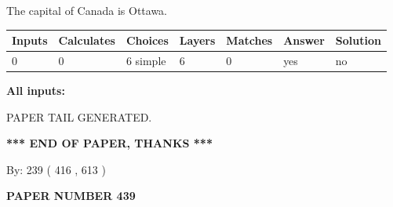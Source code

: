 \documentclass[12pt]{article}
\begin{document}
 
The capital of Canada is Ottawa.
 
 
\noindent{}
 
 
   
   
   
   
\noindent\begin{tabular}{|l|l|l|l|l|l|l|}
 \hline
Inputs & Calculates & Choices & Layers & Matches & Answer & Solution \\ \hline
 0  & 
 0  & 
 6
  simple  
  & 
 6  & 
 0  & 
  yes & 
  no 
  \\ \hline
 \end{tabular}
   
   
   
   
\noindent{}
   
   
   
   
\noindent\vspace{0.1in}\hspace{-0.08in} {\textbf{\Large{All inputs: }}}
   
   
   
   
   
   
 \vspace{0.2in}
 
   
   
\vspace{2.0in} PAPER TAIL GENERATED.
   
   
   
   
\vspace{1.0in} 
{\textbf{\large{ *** END OF PAPER, THANKS *** }}} 
   
   
\hspace{1.0in} By: 
 239 ( 416 ,  613 )
   
   
   
   
\newpage 
\setcounter{page}{ 
   439001 } 
   
   
   
   
 {\textbf{ \Large{ PAPER NUMBER  439  }}}
   
   
\vspace{0.2in}
   
   
   
   
   
   
   
\end{document}
